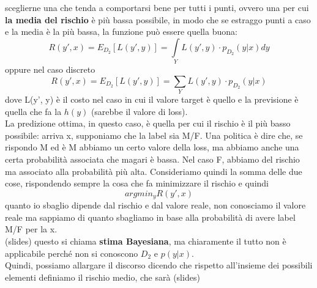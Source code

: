 \documentclass[12pt, oneside]{extbook}
\begin{document}
sceglierne una che tenda a comportarsi bene per tutti i punti, ovvero una per cui \textbf{la media del rischio} è più bassa possibile, in modo che se estraggo punti a caso e la media è la più bassa, la funzione può essere quella buona:
\begin{equation}
	R(y', x) = E_ {D_2}[L(y', y)] = \int\limits_{Y} L(y', y) \cdot p_{D_2}(y|x) dy
\end{equation}
oppure nel caso discreto
\begin{equation}
	R(y', x) = E_ {D_2}[L(y', y)] = \sum\limits_{Y} L(y', y) \cdot p_{D_2}(y|x)
\end{equation}	
dove L(y', y) è il costo nel caso in cui il valore target è quello e la previsione è quella che fa la $h(y)$ (sarebbe il valore di loss).\\La predizione ottima, in questo caso, è quella per cui il rischio è il più basso possibile: arriva x, supponiamo che la label sia M/F. Una politica è dire che, se rispondo M ed è M abbiamo un certo valore della loss, ma abbiamo anche una certa probabilità associata che magari è bassa. Nel caso F, abbiamo del rischio ma associato alla probabilità più alta. Consideriamo quindi la somma delle due cose, rispondendo sempre la cosa che fa minimizzare il rischio e quindi 
\begin{equation}
	argmin_{y} R(y', x)
\end{equation}
quanto io sbaglio dipende dal rischio e dal valore reale, non conosciamo il valore reale ma sappiamo di quanto sbagliamo in base alla probabilità di avere label M/F per la x.\\(slides) questo si chiama \textbf{stima Bayesiana}, ma chiaramente il tutto non è applicabile perché non si conoscono $D_2$ e $p(y|x)$.\\Quindi, possiamo allargare il discorso dicendo che rispetto all'insieme dei possibili elementi definiamo il rischio medio, che sarà (slides)
\end{document}

